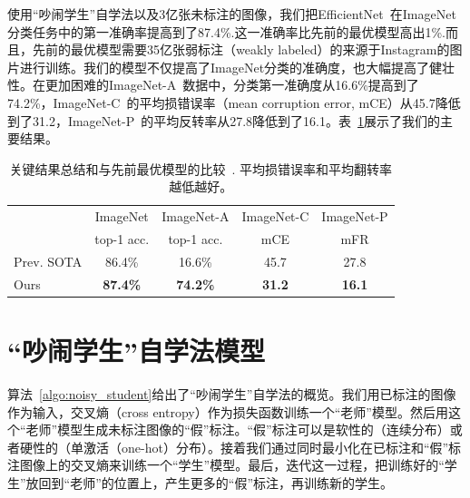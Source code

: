 \documentclass[10pt]{article}
\begin{document}
使用“吵闹学生”自学法以及3亿张未标注的图像，我们把\-EfficientNet~\cite{tan2019efficientnet}\-在\-ImageNet\-分类任务中的第一准确率提高到了87.4\%.这一准确率比先前的最优模型高出1\%.而且，先前的最优模型需要35亿张弱标注（weakly labeled）的来源于Instagram的图片进行训练。我们的模型不仅提高了\-ImageNet\-分类的准确度，也大幅提高了健壮性。在更加困难的\-ImageNet-A~\cite{hendrycks2019natural}\-数据中，分类第一准确度从16.6\%提高到了74.2\%，ImageNet-C~\cite{hendrycks2018benchmarking}的平均损错误率（mean corruption error, mCE）从45.7降低到了31.2，ImageNet-P~\cite{hendrycks2018benchmarking}的平均反转率从27.8降低到了16.1。表~\ref{tab:summary}展示了我们的主要结果。

\begin{table}[h!]
	\footnotesize
	\centering 
	\begin{tabular}{l|cccc}           
		\toprule 
		&  ImageNet & ImageNet-A & ImageNet-C & ImageNet-P \\
		&  top-1 acc. & top-1 acc. & mCE & mFR \\
		\midrule      
		
		Prev. SOTA  & 86.4\% & 16.6\% & 45.7 & 27.8\\  %
		Ours & \bf 87.4\% & \bf 74.2\% & \bf 31.2 & \bf 16.1\\ %
		\bottomrule
	\end{tabular}
	\caption{关键结果总结和与先前最优模型的比较~\cite{touvron2019fixing,mahajan2018exploring}. 平均损错误率和平均翻转率越低越好。}  
	\label{tab:summary}
\end{table}

\section{“吵闹学生”自学法模型}
算法~\ref{algo:noisy_student}给出了“吵闹学生”自学法的概览。我们用已标注的图像作为输入，交叉熵（cross entropy）作为损失函数训练一个“老师”模型。然后用这个“老师”模型生成未标注图像的“假”标注。“假”标注可以是软性的（连续分布）或者硬性的（单激活（one-hot）分布）。接着我们通过同时最小化在已标注和“假”标注图像上的交叉熵来训练一个“学生”模型。最后，迭代这一过程，把训练好的“学生”放回到“老师”的位置上，产生更多的“假”标注，再训练新的学生。
\end{document}

